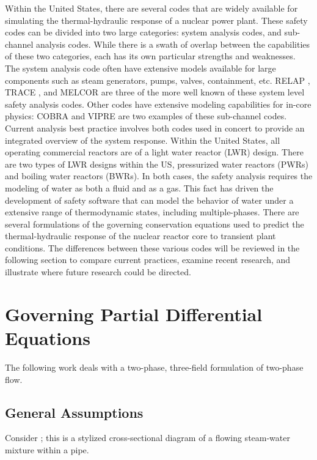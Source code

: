 Within the United States, there are several codes that are widely available for simulating the thermal-hydraulic response of a nuclear power plant.
These safety codes can be divided into two large categories: system analysis codes, and sub-channel analysis codes.
While there is a swath of overlap between the capabilities of these two categories, each has its own particular strengths and weaknesses.
The system analysis code often have extensive models available for large components such as steam generators, pumps, valves, containment, etc.
RELAP \cite{RELAP}, TRACE \cite{TRACE}, and MELCOR \cite{Summers1994} are three of the more well known of these system level safety analysis codes.
Other codes have extensive modeling capabilities for in-core physics: COBRA \cite{Thurgood1983c} and VIPRE are two examples of these sub-channel codes.
Current analysis best practice involves both codes used in concert to provide an integrated overview of the system response.
Within the United States, all operating commercial reactors are of a light water reactor (LWR) design.
There are two types of LWR designs within the US, pressurized water reactors (PWRs) and boiling water reactors (BWRs).
In both cases, the safety analysis requires the modeling of water as both a fluid and as a gas.
This fact has driven the development of safety software that can model the behavior of water under a extensive range of thermodynamic states, including multiple-phases.
There are several formulations of the governing conservation equations used to predict the thermal-hydraulic response of the nuclear reactor core to transient plant conditions.
The differences between these various codes will be reviewed in the following section to compare current practices, examine recent research, and illustrate where future research could be directed.



\section{Governing Partial Differential Equations}
\label{subsect:pdes}

The following work deals with a two-phase, three-field formulation of two-phase flow.



\subsection{General Assumptions}
\label{subsect:assumptions}
Consider ; this is a stylized cross-sectional diagram of a flowing steam-water mixture within a pipe.


